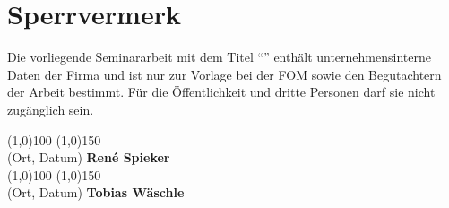 \section*{Sperrvermerk}
Die vorliegende Seminararbeit mit dem Titel ``\MyTitel{}'' enthält unternehmensinterne Daten der Firma \MyFirma{} und ist nur zur Vorlage bei der FOM sowie den Begutachtern der Arbeit bestimmt. Für die Öffentlichkeit und dritte Personen darf sie nicht zugänglich sein.
\\[3cm]
\begin{flushright}
\line(1,0){100} \hfill \line(1,0){150}\\
(Ort, Datum) \hfill \textbf{René Spieker}\\[1.5cm]
\line(1,0){100} \hfill \line(1,0){150}\\
(Ort, Datum) \hfill \textbf{Tobias Wäschle}\\
\end{flushright}
